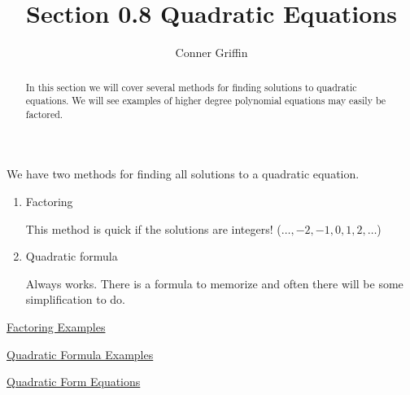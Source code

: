 \documentclass{ximera}
\title{Section 0.8 Quadratic Equations}
\author{Conner Griffin}
\begin{document}
\begin{abstract}
    In this section we will cover several methods for finding solutions to quadratic equations. We will see examples of higher degree polynomial equations may easily be factored.
\end{abstract}

\maketitle



We have two methods for finding all solutions to a quadratic equation.

\begin{enumerate}
    \item[Method 1] Factoring
    
        This method is quick if the solutions are integers! (\(\dots,-2,-1,0,1,2,\dots\))
    \item[Method 2] Quadratic formula
    
        Always works. There is a formula to memorize and often there will be some simplification to do.
\end{enumerate}
\newpage
\underline{Factoring Examples} %



\underline{Quadratic Formula Examples} %



\underline{Quadratic Form Equations}




\end{document}
